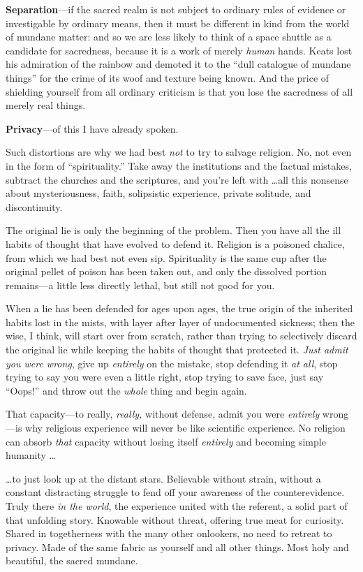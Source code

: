 {
 \textbf{Separation}{}---if the sacred realm is not subject to
ordinary rules of evidence or investigable by ordinary means, then it
must be different in kind from the world of mundane matter: and so we
are less likely to think of a space shuttle as a candidate for
sacredness, because it is a work of merely \textit{human} hands. Keats
lost his admiration of the rainbow and demoted it to the
``dull catalogue of mundane things''
for the crime of its woof and texture being known. And the price of
shielding yourself from all ordinary criticism is that you lose the
sacredness of all merely real things.}

{
 \textbf{Privacy}{}---of this I have already spoken.}

{
 Such distortions are why we had best \textit{not} to try to
salvage religion. No, not even in the form of
``spirituality.'' Take away the
institutions and the factual mistakes, subtract the churches and the
scriptures, and you're left with \ldots all this
nonsense about mysteriousness, faith, solipsistic experience, private
solitude, and discontinuity.}

{
 The original lie is only the beginning of the problem. Then you
have all the ill habits of thought that have evolved to defend it.
Religion is a poisoned chalice, from which we had best not even sip.
Spirituality is the same cup after the original pellet of poison has
been taken out, and only the dissolved portion remains---a little less
directly lethal, but still not good for you.}

{
 When a lie has been defended for ages upon ages, the true origin
of the inherited habits lost in the mists, with layer after layer of
undocumented sickness; then the wise, I think, will start over from
scratch, rather than trying to selectively discard the original lie
while keeping the habits of thought that protected it. \textit{Just
admit you were wrong}, give up \textit{entirely} on the mistake, stop
defending it \textit{at all}, stop trying to say you were even a little
right, stop trying to save face, just say
``Oops!'' and throw out the
\textit{whole} thing and begin again.}

{
 That capacity---to really, \textit{really,} without defense, admit
you were \textit{entirely} wrong---is why religious experience will
never be like scientific experience. No religion can absorb
\textit{that} capacity without losing itself \textit{entirely} and
becoming simple humanity \ldots}

{
 \ldots to just look up at the distant stars. Believable without
strain, without a constant distracting struggle to fend off your
awareness of the counterevidence. Truly there \textit{in the world},
the experience united with the referent, a solid part of that unfolding
story. Knowable without threat, offering true meat for curiosity.
Shared in togetherness with the many other onlookers, no need to
retreat to privacy. Made of the same fabric as yourself and all other
things. Most holy and beautiful, the sacred mundane.}

